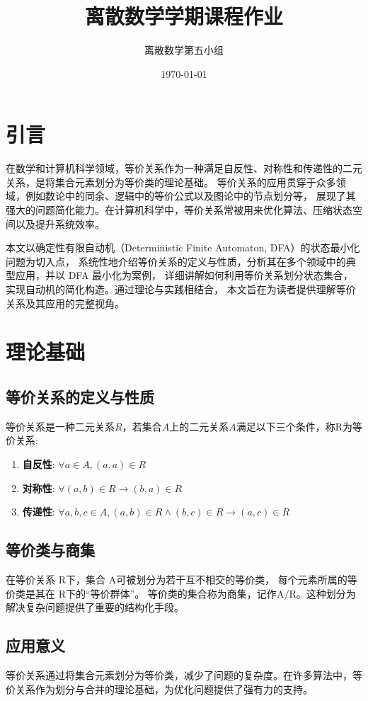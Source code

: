 \documentclass{article}
\title{离散数学学期课程作业}
\author{离散数学第五小组}
\date{\today}
\begin{document}
\maketitle

\section{引言}


    在数学和计算机科学领域，等价关系作为一种满足自反性、对称性和传递性的二元关系，是将集合元素划分为等价类的理论基础。
等价关系的应用贯穿于众多领域，例如数论中的同余、逻辑中的等价公式以及图论中的节点划分等，
展现了其强大的问题简化能力。在计算机科学中，等价关系常被用来优化算法、压缩状态空间以及提升系统效率。

    本文以确定性有限自动机（Deterministic Finite Automaton, DFA）的状态最小化问题为切入点，
系统性地介绍等价关系的定义与性质，分析其在多个领域中的典型应用，并以 DFA 最小化为案例，
详细讲解如何利用等价关系划分状态集合，实现自动机的简化构造。通过理论与实践相结合，
本文旨在为读者提供理解等价关系及其应用的完整视角。

\newpage
\section{理论基础}
\subsection{等价关系的定义与性质}
    等价关系是一种二元关系$R$，若集合$A$上的二元关系$A$满足以下三个条件，称$\mathrm{R}$为等价关系:
\begin{enumerate}
    \item \textbf{自反性}: $\forall a \in A, (a,a) \in R$
    \item \textbf{对称性}: $\forall (a,b)\in R \rightarrow (b,a) \in R $
    \item \textbf{传递性}: $\forall a,b,c \in A, (a,b) \in R \wedge (b,c) \in R \rightarrow (a,c) \in R$
\end{enumerate}
\subsection{等价类与商集}
在等价关系 $\mathrm{R}$下，集合 $\mathrm{A}$可被划分为若干互不相交的等价类，
每个元素所属的等价类是其在 $\mathrm{R}$下的“等价群体”。
等价类的集合称为商集，记作$\mathrm{A}/\mathrm{R}$。这种划分为解决复杂问题提供了重要的结构化手段。

\subsection{应用意义}
等价关系通过将集合元素划分为等价类，减少了问题的复杂度。在许多算法中，等价关系作为划分与合并的理论基础，为优化问题提供了强有力的支持。
\end{document}
